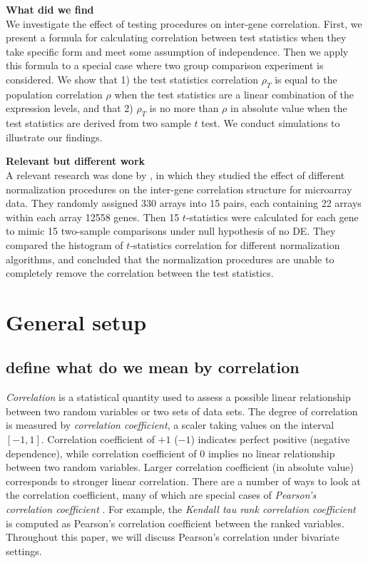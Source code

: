 \documentclass[12pt, a4paper]{article}
\begin{document}
	
		\textbf{What did we find}\\
	We investigate the effect of testing procedures on inter-gene correlation. First, we present a 
	formula for calculating correlation between test statistics when they take specific form and 
	meet some assumption of independence. Then we apply this formula to a special case where two 
	group comparison experiment is considered. We show that 1) the test statistics correlation 
	$\rho_T$ is equal to the population correlation $\rho$ when the test statistics are a linear 
	combination of the expression levels, and that 2) $\rho_T$ is no more than $\rho$ in absolute 
	value when the test statistics are derived from two sample $t$ test. We conduct simulations to 
	illustrate our findings.
		
	
	\textbf{Relevant but different work}\\
	A relevant research was done by \citet{qiu2005effects}, in which they studied the effect of different
	normalization procedures on the inter-gene correlation structure for microarray data. They randomly
	assigned 330 arrays into 15 pairs, each containing 22 arrays within each array 12558 genes. Then 15
	$t$-statistics were calculated for each gene to mimic 15 two-sample comparisons under null
	hypothesis of no DE. They compared the histogram of $t$-statistics correlation for different
	normalization algorithms, and concluded that the normalization procedures are unable to completely
	remove the correlation between the test statistics. %
	

	
	
	
	
	
	\section{General setup}
	
	\subsection{define what do we mean by correlation}
	\textit{Correlation} is a statistical quantity used to assess a possible linear relationship between two random variables or two sets of 
	data sets. The degree of correlation is measured by \textit{correlation coefficient}, a scaler taking values on the interval $[-1, 1]$. 
	Correlation coefficient of $+1$ ($-1$) indicates perfect positive (negative dependence), while correlation coefficient of 0 implies no linear 
	relationship between two random variables. Larger correlation coefficient (in absolute value) corresponds to stronger linear correlation. 
	There are a number of ways to look at the correlation coefficient, many of which are special 
	cases of \textit{Pearson's correlation coefficient} 
	\citep{lee1988thirteen}. For example, the \textit{Kendall tau rank correlation coefficient} is 
	computed as Pearson's correlation coefficient between the ranked variables. Throughout this 
	paper, we will discuss Pearson's correlation under bivariate settings. 
	 
\end{document}
